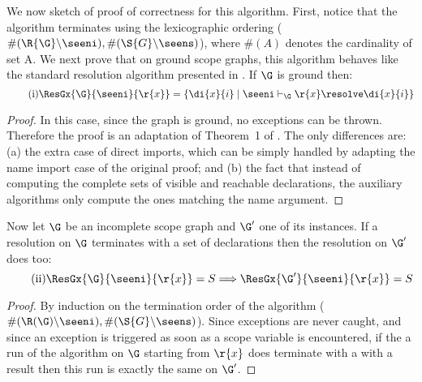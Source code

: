 We now sketch of proof of correctness for this algorithm.
First, notice that the algorithm terminates using the lexicographic ordering ($\#(\R{\G}\backslash\seeni),\#(\S{G}\backslash\seens)$), where $\#(A)$ denotes the cardinality of set A.
We next prove that on ground scope graphs, this algorithm behaves like the standard resolution algorithm presented in 
\cite{NeronTVW-ESOP-2015}.  If $\G$ is ground then:\vspace*{-2mm}
\begin{equation}\tag{i}
  \label{eq:resground}
 \ResGx{\G}{\seeni}{\r{x}} = \{ \di{x}{i} \mid \seeni \vdash_\G \r{x} \resolve \di{x}{i}\}\vspace*{-2mm}
\end{equation}
\begin{proof}
In this case, since the graph is ground, no exceptions can be thrown. Therefore the proof is an adaptation of Theorem~1 of \cite{NeronTVW-ESOP-2015}. The only differences are:
(a) the extra case of direct imports, which can be simply handled by adapting the name import case of the original proof; and
(b) the fact that instead of computing the complete sets of visible and reachable declarations, the auxiliary algorithms only compute the ones matching the name argument.
\end{proof}

Now let $\G$ be an incomplete scope graph and $\G'$ one of its instances. If a resolution on $\G$ terminates with a set of declarations then the resolution on $\G'$ does too:\vspace*{-2mm}
\begin{equation}\tag{ii}
  \label{eq:reseq}
  \ResGx{\G}{\seeni}{\r{x}} = S \Longrightarrow  \ResGx{\G'}{\seeni}{\r{x}} = S  \vspace*{-2mm}
\end{equation}

\begin{proof} By induction on the termination order of the algorithm ($\#(\R(\G)\backslash\seeni),\#(\S{G}\backslash\seens)$). 
Since exceptions are never caught, and since an exception is triggered as soon as a scope variable is encountered, if the a run of the algorithm on $\G$ starting from $\r{x}$ does terminate with a with a result then this run is exactly the same on $\G'$. 
\end{proof}

